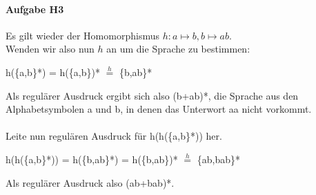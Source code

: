 \documentclass[11pt]{article}
\begin{document}
\paragraph{Aufgabe H3}
Es gilt wieder der Homomorphismus $h:a \mapsto b, b \mapsto ab$.
\\Wenden wir also nun $h$ an um die Sprache zu bestimmen: 
\begin{center}
h(\{a,b\}*) = h(\{a,b\})* $\overset{h}{=}$ \{b,ab\}*
\end{center}
Als regulärer Ausdruck ergibt sich also (b+ab)*, die Sprache aus den Alphabetsymbolen a und b, in denen das Unterwort aa nicht vorkommt. 
\\ \\Leite nun regulären Ausdruck für h(h(\{a,b\}*)) her. 
\begin{center}
h(h(\{a,b\}*)) = h(\{b,ab\}*) = h(\{b,ab\})* $\overset{h}{=}$ \{ab,bab\}*
\end{center}
Als regulärer Ausdruck also (ab+bab)*.
\end{document}

